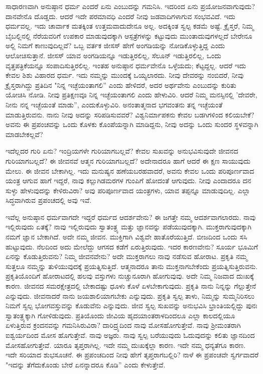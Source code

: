 ಸಾಧಾರಣವಾಗಿ ಅನುಷ್ಠಾನ ಧರ್ಮ ಎಂದರೆ ಏನು ಎಂಬುದನ್ನು ಗಮನಿಸಿ. ಇದರಿಂದ ಏನು ಪ್ರಯೋಜನವಾಗುವುದು? ದಾನವೇನೊ ದೊಡ್ಡದು. ಆದರೆ ಇದೇ ಪರಮಾವಧಿ ಎಂದರೆ ನೀವು ಜಡವಾದಿಗಳಾಗುವ ಸಂಭವವಿದೆ. ಇದು ಧರ್ಮವಲ್ಲ. ಇದು ಚಾರ್ವಾಕ ಮತಕ್ಕಿಂತ ಉತ್ತಮವಾದುದೇನೂ ಅಲ್ಲ. ಅದಕ್ಕಿಂತ ಸ್ವಲ್ಪ ಕಡಮೆ ಅಷ್ಟೆ. ಕ್ರೈಸ್ತರೆ, ನಿಮ್ಮ ಬೈಬಲ್ಲಿನಲ್ಲಿ ನೆರೆಯವರಿಗೆ ಉಪಕಾರ ಮಾಡುವುದಕ್ಕಾಗಿ ಆಸ್ಪತ್ರೆಗಳನ್ನು ಕಟ್ಟುವುದು ಮುಂತಾದುವುಗಳಲ್ಲದೆ ಬೇರೇನೂ ಅಲ್ಲಿ ನಿಮಗೆ ಕಾಣುವುದಿಲ್ಲವೆ? ಒಬ್ಬ ವರ್ತಕ ಜೀಸಸ್ ಹೇಗೆ ಅಂಗಡಿಯನ್ನು ನೋಡಿಕೊಳ್ಳುತ್ತಿದ್ದ ಎಂದು ಆಲೋಚಿಸುತ್ತಾನೆ. ಜೀಸಸ್ ಯಾವ ಅಂಗಡಿಯನ್ನೂ ಇಡುತ್ತಿರಲಿಲ್ಲ, ಸೆಲೂನ್ ಇಡುತ್ತಿರಲಿಲ್ಲ, ಒಂದು ವೃತ್ತಪತ್ರಿಕೆಯನ್ನೂ ಸಂಪಾದಿಸುತ್ತಿರಲಿಲ್ಲ. ಇಂತಹ ಅನುಷ್ಠಾನ ಧರ್ಮವೇನೊ ಒಳ್ಳೆಯದು; ಕೆಟ್ಟದ್ದಲ್ಲ. ಆದರೆ ಇದು ಕೇವಲ ಶಿಶು ವಿಹಾರದ ಧರ್ಮ. ಇದು ನಮ್ಮನ್ನು ಮುಂದಕ್ಕೆ ಒಯ್ಯಲಾರದು. ನೀವು ದೇವರನ್ನು ನಂಬಿದರೆ, ನೀವು ಕ್ರೈಸ್ತರಾಗಿದ್ದು ಪ್ರತಿದಿನ "ನಿನ್ನ ಇಚ್ಛೆಯಂತಾಗಲಿ” ಎಂದು ಹೇಳಿದರೆ, ಅದರ ಅರ್ಥವೇನು ಎಂಬುದನ್ನು ಕುರಿತು ಯೋಚಿಸಿ ನೋಡಿ. ನೀವು ಪ್ರತಿಕ್ಷಣವೂ ನಿನ್ನ ಇಚ್ಛೆಯಂತಾಗಲಿ ಎಂದು ಹೇಳುವಿರಿ. ಆದರೆ ನಿಮ್ಮ ಮನಸ್ಸಿನಲ್ಲಿ 'ದೇವರೇ, ನೀನು ನನ್ನ ಇಚ್ಛೆಯಂತೆ ಮಾಡು'', ಎಂದುಕೊಳ್ಳುವಿರಿ. ಅನಂತಾತ್ಮನಾದ ಭಗವಂತನು ತನ್ನ ಇಚ್ಛೆಯಂತೆ ಮಾಡುತ್ತಿರುವನು. ನಾನು ನೀವು ಅದನ್ನು ಸರಿಪಡಿಸುವವರೆ? ವಿಶ್ವನಿರ್ಮಾಪಕನು ಕೇವಲ ಬಡಗಿಗಳಿಂದ ಕಲಿಯಬೇಕೆ? ಅವನು ಈ ಪ್ರಪಂಚವನ್ನು ಒಂದು ಕೊಳಕು ಕೊಂಪೆಯನ್ನಾಗಿ ಮಾಡಿದ್ದನು, ನೀವು ಅದನ್ನು ಒಂದು ಸುಂದರ ಸ್ಥಳವನ್ನಾಗಿ ಮಾಡಬೇಕಲ್ಲವೆ?

ಇದೆಲ್ಲದರ ಗುರಿ ಏನು? ಇಂದ್ರಿಯಗಳೇ ಗುರಿಯಾಗಬಲ್ಲವೆ? ಕೇವಲ ಸುಖವನ್ನು ಅನುಭವಿಸುವುದೇ ಜೀವನದ ಗುರಿಯಾಗಬಲ್ಲದೆ? ಈ ಜೀವನವೆ ಆತ್ಮನ ಗುರಿಯಾಗಬಲ್ಲದೆ? ಅದೇನಾದರೂ ಹಾಗೆ ಆದರೆ ಈ ಕ್ಷಣ ಸಾಯುವುದು ಮೇಲು. ಈ ಜೀವನ ಬೇಕಾಗಿಲ್ಲ. ಇದು ಮನುಷ್ಯನ ಹಣೆಯಬರಹವಾದರೆ, ಅವನು ಕೇವಲ ಒಂದು ಪರಿಪೂರ್ಣವಾದ ಯಂತ್ರ ಆಗುವ ಹಾಗೆ ಇದ್ದರೆ, ನಾವು ಕಲ್ಲುಗಿಡಮರಗಳ ಗುಂಪಿಗೆ ಹೋದಂತೆ ಆಗುವುದು. ನೀವು ಎಂದಾದರೂ ದನ ಸುಳ್ಳು ಹೇಳುವುದನ್ನು ಕೇಳಿರುವಿರಾ? ಅವು ಪರಿಪೂರ್ಣವಾದ ಯಂತ್ರಗಳು, ಯಾವ ತಪ್ಪನ್ನೂ ಮಾಡುವುದಿಲ್ಲ. ಎಲ್ಲಾ ಸಿದ್ಧವಾಗಿರುವ ಪ್ರಪಂಚದಲ್ಲಿ ಅವು ಇವೆ.

ಇವೆಲ್ಲ ಅನುಷ್ಠಾನ ಧರ್ಮವಾಗದೇ ಇದ್ದರೆ ಧರ್ಮದ ಆದರ್ಶವೇನು? ಈ ಜಗತ್ತೇ ನಮ್ಮ ಆದರ್ಶವಾಗಲಾರದು. ನಾವು ಇಲ್ಲಿರುವುದು ಏತಕ್ಕೆ? ನಾವು ಇಲ್ಲಿರುವುದು ಸ್ವಾತಂತ್ರ್ಯ ಮತ್ತು ಜ್ಞಾನವನ್ನು ಪಡೆಯುವುದಕ್ಕಾಗಿ. ಮುಕ್ತರಾಗುವುದಕ್ಕಾಗಿ ನಮಗೆ ಜ್ಞಾನ ಬೇಕಾಗಿದೆ. ಅದೇ ನಮ್ಮ ಜೀವನ. ಮುಕ್ತಿಗಾಗಿ ವಿಶ್ವವೇ ಹಾತೊರೆಯುತ್ತಿದೆ. ಬೀಜದಿಂದ ಒಂದು ಸಸಿ ಹುಟ್ಟುವುದು. ನೆಲದಿಂದ ಅದು ಮೇಲೆದ್ದು ಆಗಸದ ಕಡೆಗೆ ಏರುತ್ತಿರುವುದು. ಇದರ ಕಾರಣವೇನು? ಸೂರ್ಯ ಭೂಮಿಗೆ ಏನನ್ನು ಕೊಡುತ್ತಿರುವನು? ನಿಮ್ಮ ಜೀವನವೇನು? ಅದೇ ಮುಕ್ತರಾಗಲು ನಾವು ನಡೆಸುವ ಹೋರಾಟ. ಪ್ರಕೃತಿ ನಮ್ಮ ಸುತ್ತಲೂ ನಮ್ಮನ್ನು ತುಳಿಯುವುದಕ್ಕೆ ಪ್ರಯತ್ನಿಸುತ್ತಿದೆ. ಆತ್ಮನಾದರೂ ತಾನು ಮುಕ್ತನಾಗಬೇಕೆಂದು ಪ್ರಯತ್ನಿಸುತ್ತಿರುವನು. ಪ್ರಕೃತಿಯೊಂದಿಗೆ ಹೋರಾಟದಲ್ಲಿ ಹಲವು ವಸ್ತುಗಳು ನುಚ್ಚುನೂರಾಗಿ ಹೋಗುವುವು. ಅದೇ ನಿಮ್ಮ ನಿಜವಾದ ದುಃಖಕ್ಕೆ ಕಾರಣ. ಜೀವನದ ಸಮರಕ್ಷೇತ್ರದಲ್ಲಿ ಬೇಕಾದಷ್ಟು ಧೂಳು ಕೊಳೆ ಏಳಬೇಕಾಗುವುದು. ಪ್ರಕೃತಿ ನಾನು ನಿನ್ನನ್ನು ಗೆಲ್ಲುತ್ತೇನೆ ಎನ್ನುವುದು. ಜೀವನಾದರೆ ನಾನು ಜಯಶಾಲಿಯಾಗಬೇಕು ಎನ್ನುವುದು. ಪ್ರಕೃತಿ ಸ್ವಲ್ಪ ತಾಳು, ನಿಮ್ಮನ್ನು ಸುಮ್ಮನಿರಿಸಲು ನಿಮಗೆ ಸ್ವಲ್ಪ ಭೋಗವಸ್ತುವನ್ನು ಕೊಡುವೆನು ಎನ್ನುವುದು. ಜೀವ ಸ್ವಲ್ಪ ಸುಖವನ್ನು ಅನುಭವಿಸಿ ಭ್ರಾಂತಿಯಲ್ಲಿದ್ದು ಪುನಃ ಸ್ವಾತಂತ್ರ್ಯಕ್ಕಾಗಿ ಗೋಳಿಡುವುದು. ಪ್ರತಿಯೊಂದು ಜೀವಿಯ ಹೃದಯಾಂತರಾಳದಿಂದಲೂ ಎಲ್ಲಾ ಕಾಲದಲ್ಲಿಯೂ ಏಳುತ್ತಿರುವ ಕ್ರಂದನವನ್ನು ಗಮನಿಸಿರುವಿರಾ? ದಾರಿದ್ರ್ಯದಿಂದ ನಾವು ಮೋಸಹೋಗುತ್ತೇವೆ. ನಾವು ಶ‍್ರೀಮಂತರಾಗಿ ಐಶ್ವರ್ಯದಿಂದ ಮೋಸ ಹೊಗುತ್ತೇವೆ. ನಾವು ಅಜ್ಞರು. ನಾವು ಸ್ವಲ್ಪ ಬರೆಯುವುದು ಓದುವುದನ್ನು ಕಲಿತು ಜ್ಞಾನದಿಂದ ಮೋಸಹೋಗುತ್ತೇವೆ. ಯಾರೂ ತೃಪ್ತರಾಗಿಲ್ಲ. ಇದೇ ನಮ್ಮ ದುಃಖಕ್ಕೆಲ್ಲಾ ಕಾರಣ. ಇದೇ ನಮ್ಮ ಧನ್ಯತೆಗೂ ಕಾರಣ. ಇದೇ ಸರಿಯಾದ ಶುಭಸೂಚನೆ. ಈ ಪ್ರಪಂಚದಿಂದ ನೀವು ಹೇಗೆ ತೃಪ್ತರಾಗಬಲ್ಲಿರಿ? ನಾಳೆ ಈ ಪ್ರಪಂಚವೇ ಸ್ವರ್ಗವಾದರೆ "ಇದನ್ನು ತೆಗೆದುಕೊಂಡು ಬೇರೆ ಏನನ್ನಾದರೂ ಕೊಡಿ'' ಎಂದು ಕೇಳುತ್ತೇವೆ.

